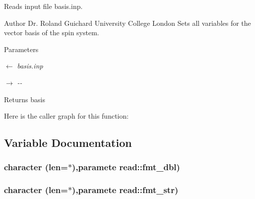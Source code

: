 Reads input file basis.inp. \begin{DoxyAuthor}{Author}
Dr. Roland Guichard University College London Sets all variables for the vector basis of the spin system.
\end{DoxyAuthor}

\begin{DoxyParams}{Parameters}
\item[\mbox{$\leftarrow$} {\em basis.inp}]\item[\mbox{$\rightarrow$} {\em -\/-\/}]\end{DoxyParams}
\begin{DoxyReturn}{Returns}
basis 
\end{DoxyReturn}


Here is the caller graph for this function:

\subsection{Variable Documentation}
\hypertarget{namespaceread_ade3b381a293cace1ee9e385aa863e859}{
\subsubsection[{fmt\_\-dbl}]{\setlength{\rightskip}{0pt plus 5cm}character (len=$\ast$),paramete {\bf read::fmt\_\-dbl})}}
\label{namespaceread_ade3b381a293cace1ee9e385aa863e859}
\hypertarget{namespaceread_a58ca3da45698b8c19b442970b4e75ec6}{
\subsubsection[{fmt\_\-str}]{\setlength{\rightskip}{0pt plus 5cm}character (len=$\ast$),paramete {\bf read::fmt\_\-str})}}
\label{namespaceread_a58ca3da45698b8c19b442970b4e75ec6}
